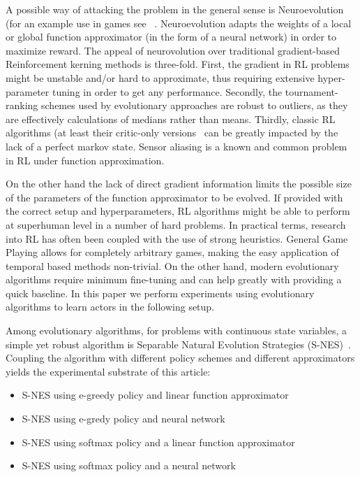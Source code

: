 \documentclass[conference]{IEEEtran}
\begin{document}
A possible way of attacking the problem in the general sense is Neuroevolution (for an example use in games see ~\cite{stanley2005real}. Neuroevolution adapts the weights of a local or global function approximator (in the form of a neural network) in order to maximize reward. The appeal of neurovolution over traditional gradient-based Reinforcement kerning methods is three-fold. First, the gradient in RL problems might be unstable and/or hard to approximate, thus requiring extensive hyper-parameter tuning in order to get any performance. Secondly, the tournament-ranking schemes used by evolutionary approaches are robust to outliers, as they are effectively calculations of medians rather than means. Thirdly, classic RL algorithms (at least their critic-only versions~\cite{singh1994learning} can be greatly impacted by the lack of a perfect markov state. Sensor aliasing is a known and common problem in RL under function approximation. 

On the other hand the lack of direct gradient information limits the possible size of the parameters of the function approximator to be evolved. If provided with the correct setup and hyperparameters, RL algorithms might be able to perform at superhuman level in a number of hard problems. In practical terms, research into RL has often been coupled with the use of strong heuristics. General Game Playing allows for completely arbitrary games, making the easy application of temporal based methods non-trivial. On the other hand, modern evolutionary algorithms require minimum fine-tuning and can help greatly with providing a quick baseline. In this paper we perform experiments using evolutionary algorithms to learn actors in the following setup. 

Among evolutionary algorithms, for problems with continuous state variables,  a simple yet robust algorithm is Separable Natural Evolution Strategies (S-NES)~\cite{schaul2011high}. Coupling the algorithm with different policy schemes and different approximators yields the experimental substrate of this article: 

\begin{itemize}
\item S-NES using e-greedy policy and linear function approximator 
\item S-NES using e-gredy policy and neural network
\item S-NES using softmax policy and a linear function approximator
\item S-NES using softmax policy and a neural network
\end{itemize}
\end{document}

